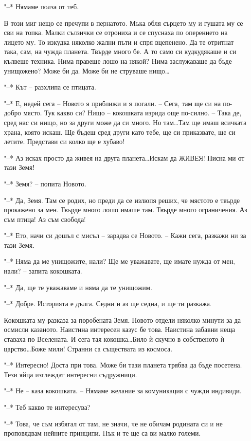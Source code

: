 \documentclass[ebook,openany,12pt]{memoir}
\begin{document}
"--* Нямаме полза от теб.

В този миг нещо се пречупи в пернатото. Мъка обля сърцето му и гушата му се сви на топка. Малки сълзички се отрониха и се спуснаха по оперението на лицето му. То изкудка няколко жални пъти и спря вцепенено. Да те отритнат така, сам, на чужда планета. Твърде много бе. А то само си кудкудякаше и си кълвеше техника. Нима правеше лошо на някой? Нима заслужаваше да бъде унищожено? Може би да. Може би не струваше нищо\ldots

"--* Кът – разхлипа се птицата.

"--* Е, недей сега – Новото я приближи и я погали. – Сега, там ще си на по-добро място. Тук какво си? Нищо – кокошката изрида още по-силно. – Така де, сред нас си нищо, но за други може да си много. Но там\ldots Там ще имаш всичката храна, която искаш. Ще бъдеш сред други като тебе, ще си приказвате, ще си летите. Представи си колко ще е хубаво!

"--* Аз исках просто да живея на друга планета\ldots Ис\-кам да ЖИВЕЯ! Писна ми от тази Земя!

"--* Земя? – попита Новото.

"--* Да, Земя. Там се родих, но преди да се излюпя реших, че мястото е твърде прокажено за мен. Твърде много лошо имаше там. Твърде много ограничения. Аз съм птица! Аз съм свобода!

"--* Ето, начи си дошъл с мисъл – зарадва се Новото. – Кажи сега, разкажи ни за тази Земя.

"--* Няма да ме унищожите, нали? Ще ме уважавате, ще имате нужда от мен, нали? – запита кокошката.

"--* Да, ще те уважаваме и няма да те унищожим.

"--* Добре. Историята е дълга. Седни и аз ще седна, и ще ти разкажа.

Кокошката му разказа за поробената Земя. Новото отдели няколко минути за да осмисли казаното. Наистина интересен казус бе това. Наистина забавни неща ставаха по Вселената. И сега тая кокошка\ldots Било ѝ скучно в собственото ѝ царство\ldots Боже мили! Странни са съществата из космоса.

"--* Интересно! Доста при това. Може би тази планета трябва да бъде посетена. Тези яйца изглеждат интересни съдружници.

"--* Не – каза кокошката. – Нямаме желание за комуникация с чужди индивиди.

"--* Теб какво те интересува?

"--* Това, че съм избягал от там, не значи, че не обичам родината си и не проповядвам нейните принципи. Пък и те ще са ви малко големи.
\end{document}

